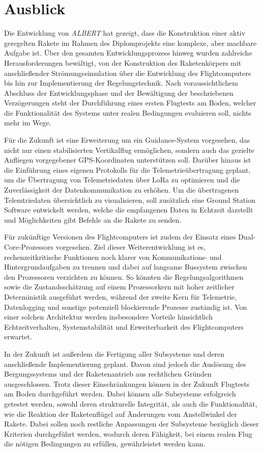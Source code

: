 \chapter{Ausblick}
\label{ch:outlook}
Die Entwicklung von \textit{ALBERT} hat gezeigt, dass die Konstruktion einer aktiv geregelten Rakete im Rahmen des Diplomprojekts eine komplexe, aber machbare Aufgabe ist. Über den gesamten Entwicklungsprozess hinweg wurden zahlreiche Herausforderungen bewältigt, von der Konstruktion des Raketenkörpers mit anschließender Strömungssimulation über die Entwicklung des Flightcomputers bis hin zur Implementierung der Regelungstechnik. Nach voraussichtlichem Abschluss der Entwicklungsphase und der Bewältigung der beschriebenen Verzögerungen steht der Durchführung eines ersten Flugtests am Boden, welcher die Funktionalität des Systems unter realen Bedingungen evaluieren soll, nichts mehr im Wege.

Für die Zukunft ist eine Erweiterung um ein Guidance-System vorgesehen, das nicht nur einen stabilisierten Vertikalflug ermöglichen, sondern auch das gezielte Anfliegen vorgegebener GPS-Koordinaten unterstützen soll. Darüber hinaus ist die Einführung eines eigenen Protokolls für die Telemetrieübertragung geplant, um die Übertragung von Telemetriedaten über LoRa zu optimieren und die Zuverlässigkeit der Datenkommunikation zu erhöhen. Um die übertragenen Telemtriedaten übersichtlich zu visualisieren, soll zusätzlich eine Ground Station Software entwickelt werden, welche die empfangenen Daten in Echtzeit darstellt und Möglichkeiten gibt Befehle an die Rakete zu senden.

Für zukünftige Versionen des Flightcomputers ist zudem der Einsatz eines Dual-Core-Prozessors vorgesehen. Ziel dieser Weiterentwicklung ist es, rechenzeitkritische Funktionen noch klarer von Kommunikations- und Hintergrundaufgaben zu trennen und dabei auf langsame Bussystem zwischen den Prozessoren verzichten zu können. So könnten die Regelungsalgorithmen sowie die Zustandsschätzung auf einem Prozessorkern mit hoher zeitlicher Deterministik ausgeführt werden, während der zweite Kern für Telemetrie, Datenlogging und sonstige potenziell blockierende Prozesse zuständig ist. Von einer solchen Architektur werden insbesondere Vorteile hinsichtlich Echtzeitverhalten, Systemstabilität und Erweiterbarkeit des Flightcomputers erwartet.

In der Zukunft ist außerdem die Fertigung aller Subsysteme und deren anschließende Implementierung geplant. Davon sind jedoch die Auslösung des Bergungssystems und der Raketenantrieb aus rechtlichen Gründen ausgeschlossen. Trotz dieser Einschränkungen können in der Zukunft Flugtests am Boden durchgeführt werden. Dabei können alle Subsysteme erfolgreich getestet werden, sowohl deren strukturelle Integrität, als auch die Funktionalität, wie die Reaktion der Raketenflügel auf Änderungen vom Anstellwinkel der Rakete. Dabei sollen noch restliche Anpassungen der Subsysteme bezüglich dieser Kriterien durchgeführt werden, wodurch deren Fähigkeit, bei einem realen Flug die nötigen Bedingungen zu erfüllen, gewährleistet werden kann.

\cleardoublepage
